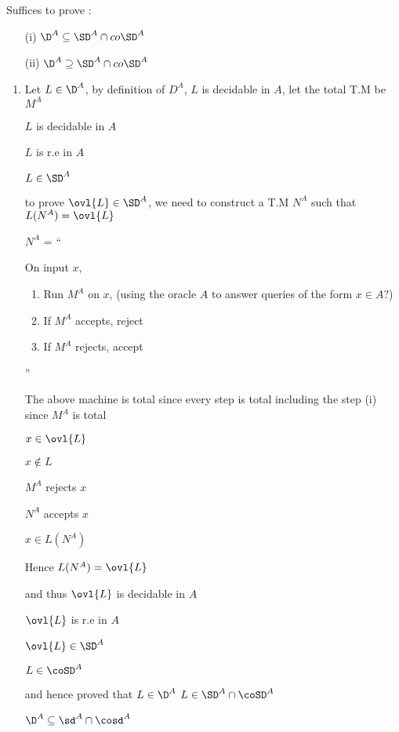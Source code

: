 
Suffices to prove :
\begin{enumerate}
    \item[(i)] $\D^A \subseteq \SD^A \cap co\SD^A$
    \item[(ii)] $\D^A \supseteq \SD^A \cap co\SD^A$
\end{enumerate}

\begin{enumerate}
    \item 
Let $L \in \D^A$,
by definition of $D^A$, $L$ is decidable in $A$, let the total T.M be $M^A$

$L$ is decidable in $A$

\imp
$L$ is r.e in $A$

\imp
$L \in \SD^A$

to prove $\ovl{L} \in \SD^A$, we need to construct a T.M $N^A$ such that $L(N^A) = \ovl{L}$


$N^A$ = ``

On input $x$,
\begin{enumerate}
    \item Run $M^A$ on $x$, (using the oracle $A$ to answer queries of the form $x \in A ?$)
    \item If $M^A$ accepts, reject
    \item If $M^A$ rejects, accept
\end{enumerate}

''

The above machine is total since every step is total including the step (i) since $M^A$ is total

$x \in \ovl{L}$

\doubleimp
$x \notin L$

\doubleimp
$M^A$ rejects $x$

\doubleimp
$N^A$ accepts $x$

\doubleimp
$x \in L(N^A)$

Hence $L(N^A) = \ovl{L}$

and thus $\ovl{L}$ is decidable in $A$

\imp
$\ovl{L}$ is r.e in $A$

\imp
$\ovl{L} \in \SD^A$

\imp
$L \in \coSD^A$

and hence proved that $L \in \D^A$ \imp $L \in \SD^A \cap \coSD^A$

\imp
$\D^A \subseteq \sd^A \cap \cosd^A$




\end{enumerate}





